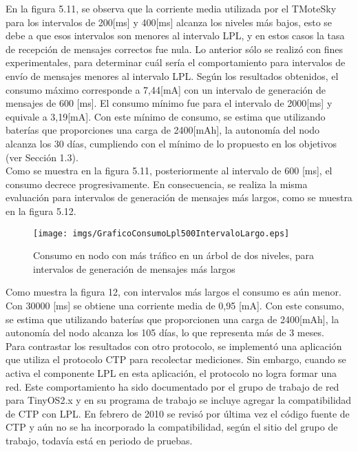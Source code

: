 En la figura 5.11, se observa que la corriente media utilizada por el TMoteSky para los intervalos de 200[ms] y 400[ms] alcanza los niveles más bajos, esto se debe a que esos intervalos son menores al intervalo LPL, y en estos casos la tasa de recepción de mensajes correctos fue nula. Lo anterior sólo se realizó con fines experimentales, para determinar cuál sería el comportamiento para intervalos de envío de mensajes menores al intervalo LPL. Según los resultados obtenidos, el  consumo máximo corresponde a 7,44[mA] con un intervalo de generación de mensajes de 600 [ms]. El consumo mínimo fue para el intervalo de 2000[ms] y equivale a 3,19[mA]. Con este mínimo de consumo, se estima que utilizando baterías que proporciones una carga de 2400[mAh], la autonomía del nodo alcanza los 30 días, cumpliendo con el mínimo de lo propuesto en los objetivos (ver Sección 1.3).\\

Como se muestra en la figura 5.11, posteriormente al intervalo de 600 [ms], el consumo decrece progresivamente. En consecuencia, se realiza la misma evaluación para intervalos de generación de mensajes más largos, como se muestra en la figura 5.12.

\begin{figure}[H]
 \centering
 \texttt{[image: imgs/GraficoConsumoLpl500IntervaloLargo.eps]}
 \caption{Consumo en nodo con más tráfico en un árbol de dos niveles, para intervalos de generación de mensajes más largos}
\end{figure}

Como muestra la figura 12, con intervalos más largos el consumo es aún menor. Con 30000 [ms] se obtiene una corriente media de 0,95 [mA]. Con este consumo, se estima que utilizando baterías que proporcionen una carga de 2400[mAh], la autonomía del nodo alcanza los 105 días, lo que representa más de 3 meses.\\

Para contrastar los resultados con otro protocolo, se implementó una aplicación que utiliza el protocolo CTP para recolectar mediciones. Sin embargo, cuando se activa el componente LPL en esta aplicación, el protocolo no logra formar una red. Este comportamiento ha sido documentado por  el grupo de trabajo de red para TinyOS2.x\cite{Net2WG} y en su programa de trabajo se incluye agregar la compatibilidad de CTP con LPL. En febrero de 2010 se revisó por última vez el código fuente de CTP y aún no se ha incorporado la compatibilidad, según el sitio del grupo de trabajo, todavía está en periodo de pruebas.

